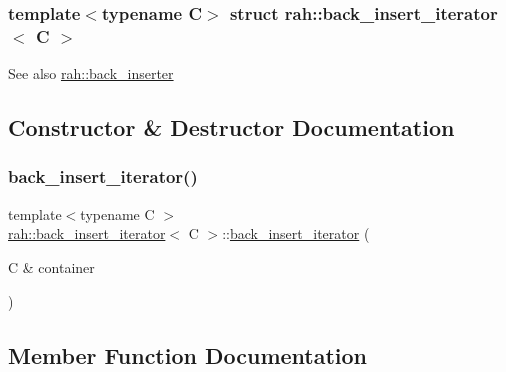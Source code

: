 \subsubsection*{template$<$typename C$>$\newline
struct rah\+::back\+\_\+insert\+\_\+iterator$<$ C $>$}

\begin{DoxySeeAlso}{See also}
\mbox{\hyperlink{namespacerah_a0698f952bc3c4f1961929bbddb5812fe}{rah\+::back\+\_\+inserter}} 
\end{DoxySeeAlso}


\subsection{Constructor \& Destructor Documentation}
\mbox{\label{structrah_1_1back__insert__iterator_a7c208b6bee5af4ca1f87a0a52df8069c}} 
\subsubsection{\texorpdfstring{back\_insert\_iterator()}{back\_insert\_iterator()}}
{\footnotesize\ttfamily template$<$typename C $>$ \\
\mbox{\hyperlink{structrah_1_1back__insert__iterator}{rah\+::back\+\_\+insert\+\_\+iterator}}$<$ C $>$\+::\mbox{\hyperlink{structrah_1_1back__insert__iterator}{back\+\_\+insert\+\_\+iterator}} (\begin{DoxyParamCaption}\item[{C \&}]{container }\end{DoxyParamCaption})\hspace{0.3cm}{\ttfamily [inline]}}



\subsection{Member Function Documentation}
\mbox{\label{structrah_1_1back__insert__iterator_a5af149b87aebf5ced8a4143afe79ad50}} 
